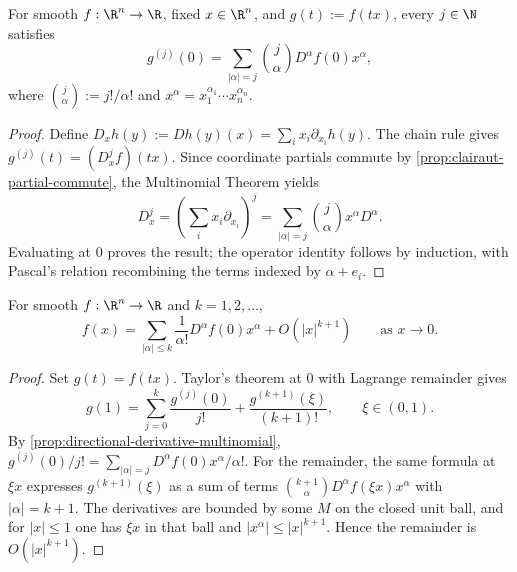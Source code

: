 \begin{proposition}
\label{prop:directional-derivative-multinomial}
\leanok
For smooth $f : \R^n \to \R$, fixed $x\in\R^n$, and
$g(t):=f(tx)$, every $j\in\N$ satisfies
\[
g^{(j)}(0)=\sum_{|\alpha|=j}\binom{j}{\alpha}D^\alpha f(0)x^\alpha,
\]
where $\binom{j}{\alpha}:=j!/\alpha!$ and
$x^\alpha=x_1^{\alpha_1}\cdots x_n^{\alpha_n}$.
\end{proposition}
\begin{proof}
\leanok
\sketch
Define $D_xh(y):=Dh(y)(x)=\sum_i x_i\partial_{x_i}h(y)$. The chain rule
gives $g^{(j)}(t)=(D_x^j f)(tx)$. Since coordinate partials commute by
\cref{prop:clairaut-partial-commute}, the Multinomial Theorem yields
\[
D_x^j=\left(\sum_i x_i\partial_{x_i}\right)^j
=\sum_{|\alpha|=j}\binom{j}{\alpha}x^\alpha D^\alpha.
\]
Evaluating at $0$ proves the result; the operator identity follows by
induction, with Pascal's relation recombining the terms indexed by
$\alpha+e_i$.
\end{proof}

\begin{proposition}
\label{prop:taylor-multiindex}
\leanok
For smooth $f : \R^n \to \R$ and $k=1,2,\ldots$,
\[
f(x)=\sum_{|\alpha|\leq k}\frac{1}{\alpha!}D^\alpha f(0)x^\alpha
+O(|x|^{k+1})\qquad\text{as }x\to0.
\]
\end{proposition}
\begin{proof}
\leanok
\sketch
Set $g(t)=f(tx)$. Taylor's theorem at $0$ with Lagrange remainder gives
\[
g(1)=\sum_{j=0}^k\frac{g^{(j)}(0)}{j!}
 +\frac{g^{(k+1)}(\xi)}{(k+1)!},\qquad \xi\in(0,1).
\]
By \cref{prop:directional-derivative-multinomial},
$g^{(j)}(0)/j!=\sum_{|\alpha|=j}D^\alpha f(0)x^\alpha/\alpha!$.
For the remainder, the same formula at $\xi x$ expresses
$g^{(k+1)}(\xi)$ as a sum of terms
$\binom{k+1}{\alpha}D^\alpha f(\xi x)x^\alpha$ with $|\alpha|=k+1$.
The derivatives are bounded by some $M$ on the closed unit ball, and for
$|x|\leq1$ one has $\xi x$ in that ball and
$|x^\alpha|\leq|x|^{k+1}$. Hence the remainder is
$O(|x|^{k+1})$.
\end{proof}
